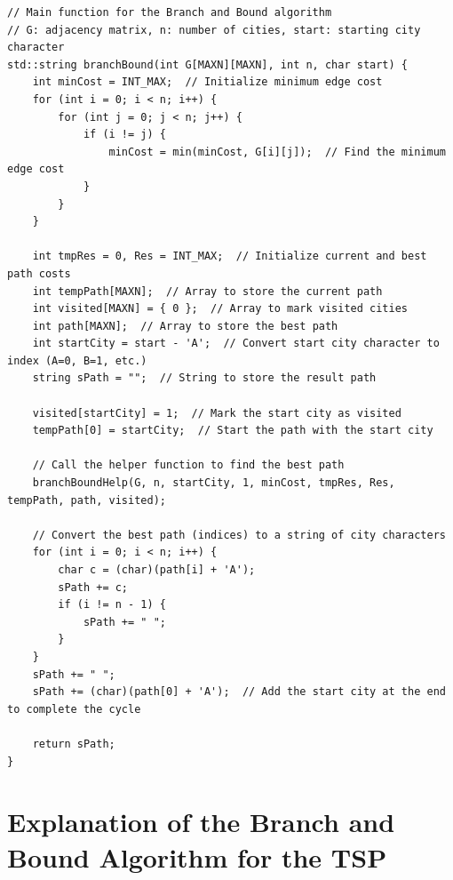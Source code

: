 \documentclass[a4paper]{article}
\begin{document}
\begin{verbatim}
// Main function for the Branch and Bound algorithm
// G: adjacency matrix, n: number of cities, start: starting city character
std::string branchBound(int G[MAXN][MAXN], int n, char start) {
    int minCost = INT_MAX;  // Initialize minimum edge cost
    for (int i = 0; i < n; i++) {
        for (int j = 0; j < n; j++) {
            if (i != j) {
                minCost = min(minCost, G[i][j]);  // Find the minimum edge cost
            }
        }
    }

    int tmpRes = 0, Res = INT_MAX;  // Initialize current and best path costs
    int tempPath[MAXN];  // Array to store the current path
    int visited[MAXN] = { 0 };  // Array to mark visited cities
    int path[MAXN];  // Array to store the best path
    int startCity = start - 'A';  // Convert start city character to index (A=0, B=1, etc.)
    string sPath = "";  // String to store the result path

    visited[startCity] = 1;  // Mark the start city as visited
    tempPath[0] = startCity;  // Start the path with the start city

    // Call the helper function to find the best path
    branchBoundHelp(G, n, startCity, 1, minCost, tmpRes, Res, tempPath, path, visited);

    // Convert the best path (indices) to a string of city characters
    for (int i = 0; i < n; i++) {
        char c = (char)(path[i] + 'A');
        sPath += c;
        if (i != n - 1) {
            sPath += " ";
        }
    }
    sPath += " ";
    sPath += (char)(path[0] + 'A');  // Add the start city at the end to complete the cycle

    return sPath;
}
\end{verbatim}
\section{Explanation of the Branch and Bound Algorithm for the TSP}
\end{document}
